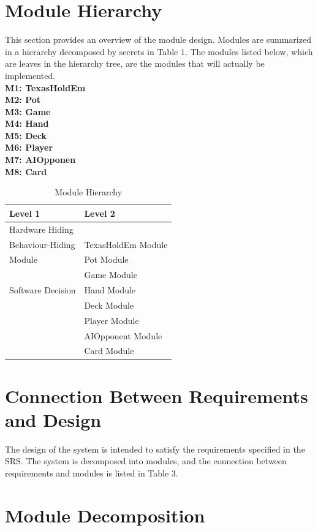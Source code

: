 \documentclass[11pt]{article}
\newcommand{\head}[1]{\textnormal{\textbf{#1}}}
\begin{document}
    \section{Module Hierarchy}
    This section provides an overview of the module design. Modules are summarized in a hierarchy decomposed by secrets in Table 1. The modules listed below, which are leaves in the hierarchy tree, are the modules that will actually be implemented.\\
    \textbf{M1: TexasHoldEm}\\
    \textbf{M2: Pot}\\
    \textbf{M3: Game}\\
    \textbf{M4: Hand}\\
    \textbf{M5: Deck}\\
    \textbf{M6: Player}\\
    \textbf{M7: AIOpponen}\\
    \textbf{M8: Card}\\
    \begin{table}[h]
    \caption{Module Hierarchy}
    \begin{tabular}{p{4cm}p{5cm}}
    \head{Level 1} & \head{Level 2} \\
    \hline
    Hardware Hiding & \\
    \hline
    Behaviour-Hiding  & TexasHoldEm Module \\
    Module & Pot Module\\
     & Game Module\\
    \hline
    Software Decision & Hand Module  \\
     & Deck Module\\
     & Player Module \\
     & AIOpponent Module\\
     & Card Module\\
    \hline
    \end{tabular}
    \end{table}
	
	\section{Connection Between Requirements and Design}
    The design of the system is intended to satisfy the requirements specified in the SRS. The system is decomposed into modules, and the connection between requirements and modules is listed in Table 3.
	\section{Module Decomposition}    
\end{document}
